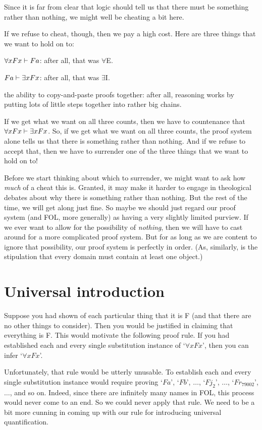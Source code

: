 Since it is far from clear that logic should tell us that there must be something rather than nothing, we might well be cheating a bit here. 

If we refuse to cheat, though, then we pay a high cost. Here are three things that we want to hold on to:
	\begin{ebullet}
		\item $\forall x Fx \vdash Fa$: after all, that was $\forall$E.
		\item $Fa \vdash \exists x Fx$: after all, that was $\exists$I.
		\item the ability to copy-and-paste proofs together: after all, reasoning works by putting lots of little steps together into rather big chains.
	\end{ebullet}
If we get what we want on all three counts, then we have to countenance that $\forall xFx \vdash \exists x Fx$. So, if we get what we want on all three counts, the proof system alone tells us that there is something rather than nothing. And if we refuse to accept that, then we have to surrender one of the three things that we want to hold on to!

Before we start thinking about which to surrender, we might want to ask how \emph{much} of a cheat this is. Granted, it may make it harder to engage in theological debates about why there is something rather than nothing. But the rest of the time, we will get along just fine. So maybe we should just regard our proof system (and FOL, more generally) as having a very slightly limited purview. If we ever want to allow for the possibility of \emph{nothing}, then we will have to cast around for a more complicated proof system. But for as long as we are content to ignore that possibility, our proof system is perfectly in order. (As, similarly, is the stipulation that every domain must contain at least one object.)


\section{Universal introduction}
Suppose you had shown of each particular thing that it is F (and that there are no other things to consider). Then you would be justified in claiming that everything is F. This would motivate the following proof rule. If you had established each and every single substitution instance of `$\forall x Fx$', then you can infer `$\forall x Fx$'. 

Unfortunately, that rule would be utterly unusable. To establish each and every single substitution instance would require proving `$Fa$', `$Fb$', $\ldots$, `$Fj_2$', $\ldots$, `$Fr_{79002}$', $\ldots$, and so on. Indeed, since there are infinitely many names in FOL, this process would never come to an end. So we could never apply that rule. We need to be a bit more cunning in coming up with our rule for introducing universal quantification. 

